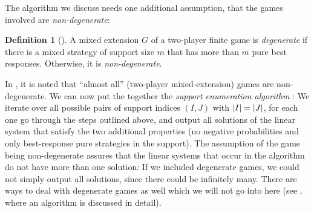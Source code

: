 \documentclass[a4paper]{scrreprt}
\theoremstyle{definition}
\newtheorem{defn}[thm]{Definition} %
\begin{document}
    The algorithm we discuss needs one additional assumption, that the games involved are \emph{non-degenerate}:
    \begin{defn}[{\cite[Definition 3.2]{bib:nisanAlgorithmicGameTheoryCh3EquilibriumComputation}}]
        A mixed extension $G$ of a two-player finite game is \emph{degenerate} if there is a mixed strategy of support size $m$ that has more than $m$ pure best responses. Otherwise, it is \emph{non-degenerate}.
        \label{def:degenerateRealValuedGame}
    \end{defn}
    In \cite[p.54]{bib:nisanAlgorithmicGameTheoryCh3EquilibriumComputation}, it is noted that “almost all” (two-player mixed-extension) games are non-degenerate.
    We can now put the together the \emph{support enumeration algorithm} \cite[Algorithm 3.4]{bib:nisanAlgorithmicGameTheoryCh3EquilibriumComputation}: We iterate over all possible pairs of support indices $(I, J)$ with $\left| I \right| = \left| J \right|$, for each one go through the steps outlined above, and output all solutions of the linear system that satisfy the two additional properties (no negative probabilities and only best-response pure strategies in the support). 
    The assumption of the game being non-degenerate assures that the linear systems that occur in the algorithm do not have more than one solution: If we included degenerate games, we could not simply output all solutions, since there could be infinitely many.
    There are ways to deal with degenerate games as well which we will not go into here (see \cite[p.65]{bib:nisanAlgorithmicGameTheoryCh3EquilibriumComputation}, where an algorithm is discussed in detail).
    
\end{document}
